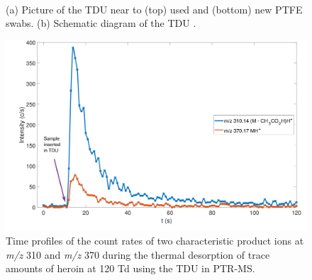 \begin{figure}%
  \\
  \caption{(a) Picture of the TDU near to (top) used and (bottom) new PTFE swabs. (b) Schematic diagram of the TDU \cite{RN445}.}\label{fig:tdu}
\end{figure}

\begin{figure}%
  \includegraphics[width=0.7\linewidth]{pics/heroin_desorption.png}
  \caption{Time profiles of the count rates of two characteristic product ions at \textit{m/z} 310 and \textit{m/z} 370 during the thermal desorption of trace amounts of heroin at 120 Td using the TDU in PTR-MS.}\label{fig:tdu_heroin}
\end{figure}




